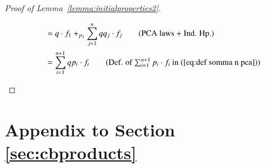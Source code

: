 \begin{proof}[Proof of Lemma~\ref{lemma:initialproperties2}]
\begin{enumerate}
\begin{align}
    &= q\cdot f_{1} +_{p_{1}} \sum_{j=1}^{n}qq_j\cdot f_j \tag{PCA laws + Ind. Hp.}\\
    &= \sum_{i=1}^{n+1}qp_i\cdot f_i \tag{Def. of $\sum_{i=1}^{n+1}{p_i}\cdot f_i$ in (\ref{eq:def somma n pca})}
\end{align}
        \end{enumerate}
\end{proof}



\section{Appendix to Section \ref{sec:cbproducts}}\label{app:sec:cbproducts}




